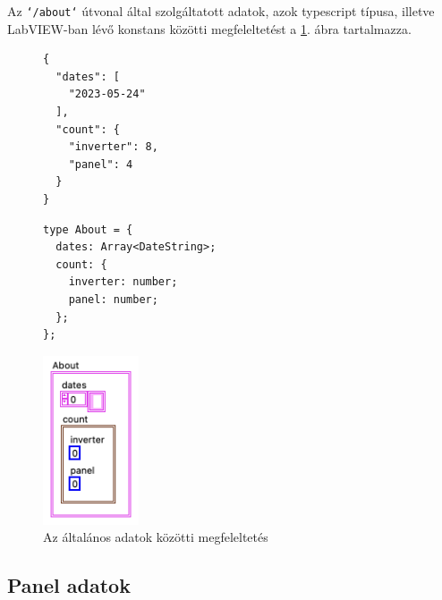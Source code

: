 Az \texttt{`/about`} útvonal által szolgáltatott adatok, azok typescript
típusa, illetve LabVIEW-ban lévő konstans közötti megfeleltetést a
\ref{fig:about}. ábra tartalmazza.
\begin{figure}[H]
  \centering
  \begin{minipage}{.3\textwidth}
    \begin{verbatim}
{
  "dates": [ 
    "2023-05-24"
  ],
  "count": {
    "inverter": 8,
    "panel": 4
  }
}
    \end{verbatim}
  \end{minipage}\begin{minipage}{.3\textwidth}
    \begin{verbatim}
type About = {
  dates: Array<DateString>;
  count: {
    inverter: number;
    panel: number;
  };
};
    \end{verbatim}
  \end{minipage}\begin{minipage}{.3\textwidth}
    \flushright
    \includegraphics[height=5cm]{static/lv-about.png}
  \end{minipage}

  \caption{Az általános adatok közötti megfeleltetés}
  \label{fig:about}
\end{figure}

\subsection{Panel adatok}

